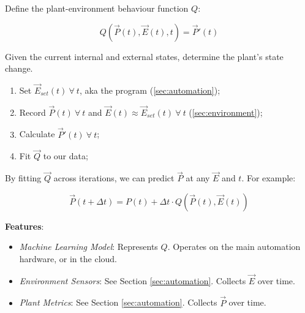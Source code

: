 \documentclass{../tex/report}
\begin{document}
Define the plant-environment behaviour function $Q$: 

$$Q(\vec P(t), \vec E(t), t)=\vec P'(t)$$ 

Given the current internal and external states, determine the plant's state change.

\begin{enumerate}
    \item Set $\vec E_{set}(t)~\forall~ t$, aka the program (\ref{sec:automation});
    \item Record $\vec P(t)~\forall~ t$ and $\vec E(t)\approx \vec E_{set}(t)~\forall~ t$ (\ref{sec:environment});
    \item Calculate $\vec P'(t)~\forall~ t$;
    \item Fit $\vec Q$ to our data;
\end{enumerate}

By fitting $\vec Q$ across iterations, we can predict $\vec P$ at any $\vec E$ and $t$. For example:

$$\vec P(t+\Delta t)=P(t)+\Delta t\cdot Q(\vec P(t),\vec E(t))$$

\textbf{Features}:
\begin{itemize}
    \item \textit{Machine Learning Model}: Represents $Q$. Operates on the main automation hardware, or in the cloud.
    \item \textit{Environment Sensors}: See Section \ref{sec:automation}. Collects $\vec E$ over time.
    \item \textit{Plant Metrics}: See Section \ref{sec:automation}. Collects $\vec P$ over time.
\end{itemize}

\newpage



\end{document}
